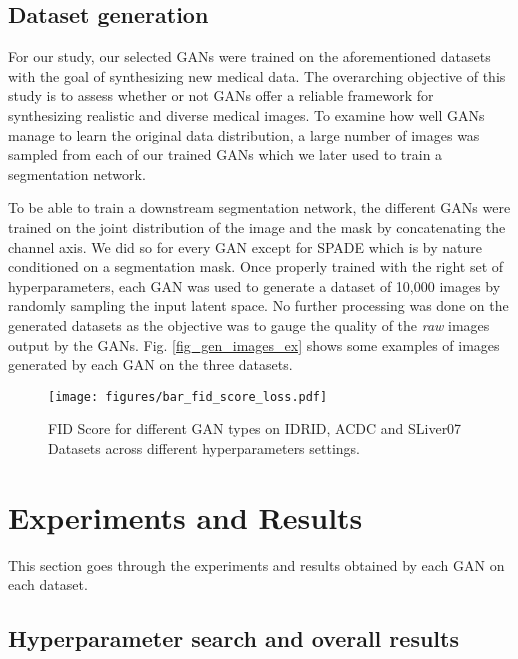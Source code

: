 \documentclass[preprint,12pt, authoryear]{elsarticle}
\begin{document}
\subsection{Dataset generation}

For our study, our selected GANs were trained on the aforementioned datasets with the goal of synthesizing new medical data.  The overarching objective of this study is to assess whether or not GANs offer a reliable framework for synthesizing realistic and diverse medical images. To examine how well GANs manage to learn the original data distribution, a large number of images was sampled from each of our trained GANs which we later used to train a segmentation network.

To be able to train a downstream segmentation network, the different GANs were trained on the joint distribution of the image and the mask by concatenating the channel axis.  We did so for every GAN except for SPADE which is by nature conditioned on a segmentation mask.
Once properly trained with the right set of hyperparameters, each GAN was used to generate a dataset of 10,000 images by randomly sampling the input latent space. No further processing was done on the generated datasets as the objective was to gauge the quality of the {\em raw} images output by the GANs. Fig. \ref{fig_gen_images_ex} shows some examples of images generated by each GAN on the three datasets.

\begin{figure}[tp]
\centering
\texttt{[image: figures/bar\_fid\_score\_loss.pdf]}
\caption{\small FID Score for different GAN types on IDRID, ACDC and SLiver07 Datasets across different hyperparameters settings.}
\label{fig_fid_loss_acdc}
\end{figure}


\section{Experiments and Results}
\label{sec:experiments}
This section goes through the experiments and results obtained by each GAN on each dataset.  

\subsection{Hyperparameter search and overall results}
\end{document}
